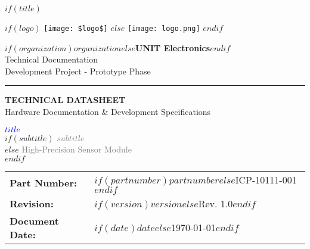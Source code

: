 \documentclass[11pt,a4paper]{article}
\begin{document}
$if(title)$
\begin{titlepage}
    \centering
    
    \vspace*{0.5cm}
    
    \begin{minipage}{0.3\textwidth}
        \centering
        $if(logo)$
        \texttt{[image: \$logo\$]}
        $else$
        \texttt{[image: logo.png]}
        $endif$
    \end{minipage}
    \hfill
    \begin{minipage}{0.6\textwidth}
        \raggedleft
        {\small \textbf{$if(organization)$$organization$$else$UNIT Electronics$endif$}}\\
        {\footnotesize Technical Documentation}\\
        {\footnotesize Development Project - Prototype Phase}
    \end{minipage}
    
    \vspace{0.5cm}
    
    {\color{blue}\rule{\textwidth}{2pt}}
    
    \vspace{1.5cm}
    
    \begin{tcolorbox}[
        colback=blue!5!white,
        colframe=blue!75!black,
        width=0.9\textwidth,
        arc=2mm,
        boxrule=1.5pt,
        halign=center
    ]
    {\Large \textbf{TECHNICAL DATASHEET}}\\[0.2cm]
    {\normalsize Hardware Documentation \& Development Specifications}
    \end{tcolorbox}
    
    \vspace{0.8cm}
    
    {\Huge \textbf{\textcolor{blue}{$title$}}}\\[0.3cm]
    
    $if(subtitle)$
    {\LARGE \textcolor{gray}{$subtitle$}}\\[0.5cm]
    $else$
    {\LARGE \textcolor{gray}{High-Precision Sensor Module}}\\[0.5cm]
    $endif$
    
    \begin{tcolorbox}[
        colback=gray!10!white,
        colframe=gray!50!black,
        width=0.7\textwidth,
        arc=1mm,
        boxrule=1pt
    ]
    \centering
    \begin{tabular}{l l}
    \textbf{Part Number:} & $if(partnumber)$$partnumber$$else$ICP-10111-001$endif$ \\
    \textbf{Revision:} & $if(version)$$version$$else$Rev. 1.0$endif$ \\
    \textbf{Document Date:} & $if(date)$$date$$else$\today$endif$
    \end{tabular}
    \end{tcolorbox}
    

\end{titlepage}
\end{document}
